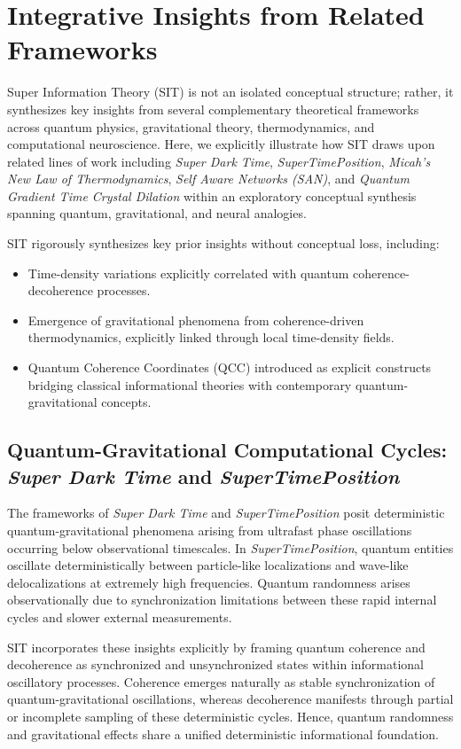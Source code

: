 \documentclass[american,11pt,letterpaper]{article}
\begin{document}
\section{Integrative Insights from Related Frameworks}

Super Information Theory (SIT) is not an isolated conceptual structure; rather, it synthesizes key insights from several complementary theoretical frameworks across quantum physics, gravitational theory, thermodynamics, and computational neuroscience. Here, we explicitly illustrate how SIT draws upon related lines of work including \textit{Super Dark Time}, \textit{SuperTimePosition}, \textit{Micah's New Law of Thermodynamics}, \textit{Self Aware Networks (SAN)}, and \textit{Quantum Gradient Time Crystal Dilation} within an exploratory conceptual synthesis spanning quantum, gravitational, and neural analogies.

SIT rigorously synthesizes key prior insights without conceptual loss, including:

\begin{itemize}
\item Time-density variations explicitly correlated with quantum coherence-decoherence processes.
\item Emergence of gravitational phenomena from coherence-driven thermodynamics, explicitly linked through local time-density fields.
\item Quantum Coherence Coordinates (QCC) introduced as explicit constructs bridging classical informational theories with contemporary quantum-gravitational concepts.
\end{itemize}

\subsection{Quantum-Gravitational Computational Cycles: \textit{Super Dark Time} and \textit{SuperTimePosition}}

The frameworks of \textit{Super Dark Time} and \textit{SuperTimePosition} posit deterministic quantum-gravitational phenomena arising from ultrafast phase oscillations occurring below observational timescales. In \textit{SuperTimePosition}, quantum entities oscillate deterministically between particle-like localizations and wave-like delocalizations at extremely high frequencies. Quantum randomness arises observationally due to synchronization limitations between these rapid internal cycles and slower external measurements.

SIT incorporates these insights explicitly by framing quantum coherence and decoherence as synchronized and unsynchronized states within informational oscillatory processes. Coherence emerges naturally as stable synchronization of quantum-gravitational oscillations, whereas decoherence manifests through partial or incomplete sampling of these deterministic cycles. Hence, quantum randomness and gravitational effects share a unified deterministic informational foundation.
\end{document}
